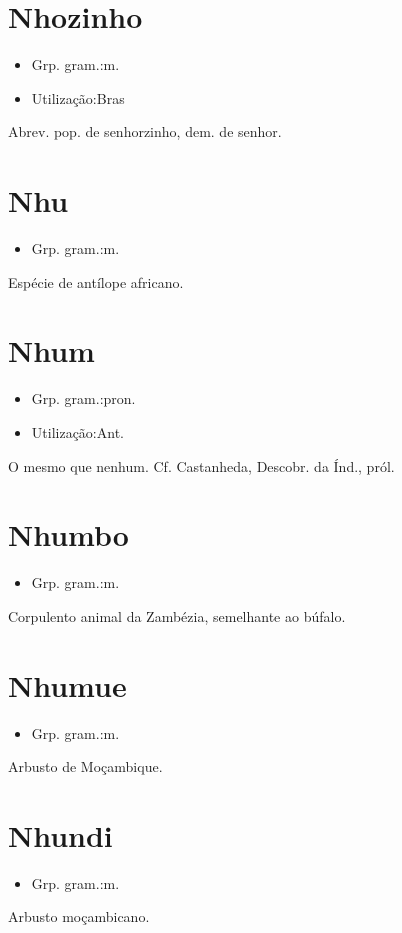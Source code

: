 \section{Nhozinho}
\begin{itemize}
\item {Grp. gram.:m.}
\end{itemize}
\begin{itemize}
\item {Utilização:Bras}
\end{itemize}
Abrev. pop. de \textunderscore senhorzinho\textunderscore , dem. de \textunderscore senhor\textunderscore .
\section{Nhu}
\begin{itemize}
\item {Grp. gram.:m.}
\end{itemize}
Espécie de antílope africano.
\section{Nhum}
\begin{itemize}
\item {Grp. gram.:pron.}
\end{itemize}
\begin{itemize}
\item {Utilização:Ant.}
\end{itemize}
O mesmo que \textunderscore nenhum\textunderscore . Cf. Castanheda, \textunderscore Descobr. da Índ.\textunderscore , pról.
\section{Nhumbo}
\begin{itemize}
\item {Grp. gram.:m.}
\end{itemize}
Corpulento animal da Zambézia, semelhante ao búfalo.
\section{Nhumue}
\begin{itemize}
\item {Grp. gram.:m.}
\end{itemize}
Arbusto de Moçambique.
\section{Nhundi}
\begin{itemize}
\item {Grp. gram.:m.}
\end{itemize}
Arbusto moçambicano.
